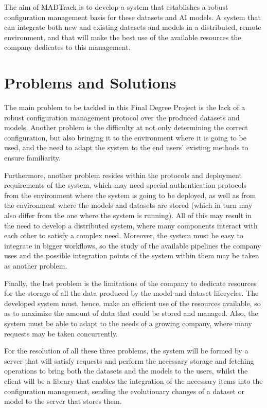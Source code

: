 The aim of MADTrack is to develop a system that establishes a robust configuration management basis for these datasets and \acrshort{AI} models. A system that can integrate
both new and existing datasets and models in a distributed, remote environment, and that will make the best use of the available resources the company dedicates
to this management.

\section{Problems and Solutions}

The main problem to be tackled in this Final Degree Project is the lack of a robust configuration management protocol over the produced datasets and models. Another
problem is the difficulty at not only determining the correct configuration, but also bringing it to the environment where it is going to be used, and the need to adapt the
system to the end users' existing methods to ensure familiarity.

Furthermore, another problem resides within the protocols and deployment requirements of the system, which may need special authentication protocols from
the environment where the system is going to be deployed, as well as from the environment where the models and datasets are stored (which in turn may also differ
from the one where the system is running). All of this may result in the need to develop a distributed system, where many components interact with each other
to satisfy a complex need. Moreover, the system must be easy to integrate in bigger workflows, so the study of the available pipelines the company uses and the 
possible integration points of the system within them may be taken as another problem.

Finally, the last problem is the limitations of the company to dedicate resources for the storage of all the data produced by the model and dataset lifecycles.
The developed system must, hence, make an efficient use of the resources available, so as to maximize the amount of data that could be stored and managed. Also,
the system must be able to adapt to the needs of a growing company, where many requests may be taken concurrently.

For the resolution of all these three problems, the system will be formed by a server that will satisfy requests and perform the necessary storage and
fetching operations to bring both the datasets and the models to the users, whilst the client will be a library that enables the integration of the
necessary items into the configuration management, sending the evolutionary changes of a dataset or model to the server that stores them.



